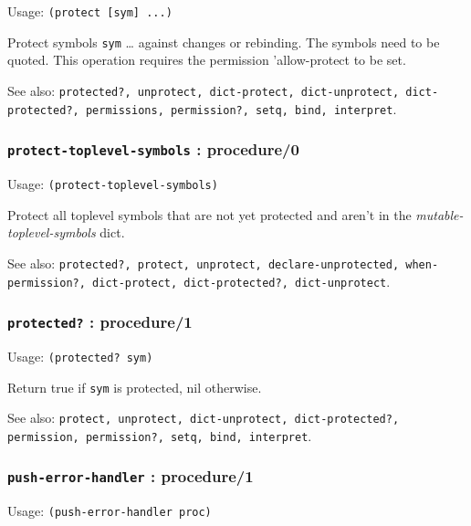 \documentclass[
]{article}
\newcommand{\passthrough}[1]{#1}
\begin{document}
Usage: \passthrough{\lstinline!(protect [sym] ...)!}

Protect symbols \passthrough{\lstinline!sym!} \ldots{} against changes
or rebinding. The symbols need to be quoted. This operation requires the
permission 'allow-protect to be set.

See also:
\passthrough{\lstinline!protected?, unprotect, dict-protect, dict-unprotect, dict-protected?, permissions, permission?, setq, bind, interpret!}.

\hypertarget{protect-toplevel-symbols-procedure0}{%
\subsubsection{\texorpdfstring{\texttt{protect-toplevel-symbols} :
procedure/0}{protect-toplevel-symbols : procedure/0}}\label{protect-toplevel-symbols-procedure0}}

Usage: \passthrough{\lstinline!(protect-toplevel-symbols)!}

Protect all toplevel symbols that are not yet protected and aren't in
the \emph{mutable-toplevel-symbols} dict.

See also:
\passthrough{\lstinline!protected?, protect, unprotect, declare-unprotected, when-permission?, dict-protect, dict-protected?, dict-unprotect!}.

\hypertarget{protected-procedure1}{%
\subsubsection{\texorpdfstring{\texttt{protected?} :
procedure/1}{protected? : procedure/1}}\label{protected-procedure1}}

Usage: \passthrough{\lstinline!(protected? sym)!}

Return true if \passthrough{\lstinline!sym!} is protected, nil
otherwise.

See also:
\passthrough{\lstinline!protect, unprotect, dict-unprotect, dict-protected?, permission, permission?, setq, bind, interpret!}.

\hypertarget{push-error-handler-procedure1}{%
\subsubsection{\texorpdfstring{\texttt{push-error-handler} :
procedure/1}{push-error-handler : procedure/1}}\label{push-error-handler-procedure1}}

Usage: \passthrough{\lstinline!(push-error-handler proc)!}
\end{document}
